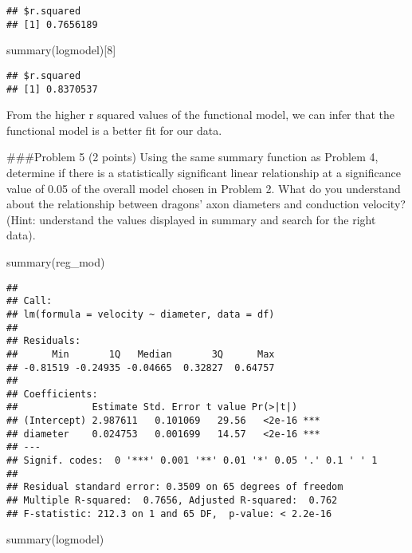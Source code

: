 \documentclass[
]{article}
\newenvironment{Shaded}{\begin{snugshade}}{\end{snugshade}}
\newcommand{\DecValTok}[1]{\textcolor[rgb]{0.00,0.00,0.81}{#1}}
\newcommand{\FunctionTok}[1]{\textcolor[rgb]{0.00,0.00,0.00}{#1}}
\newcommand{\NormalTok}[1]{#1}
\begin{document}
\begin{verbatim}
## $r.squared
## [1] 0.7656189
\end{verbatim}

\begin{Shaded}
\begin{Highlighting}[]
\FunctionTok{summary}\NormalTok{(logmodel)[}\DecValTok{8}\NormalTok{]}
\end{Highlighting}
\end{Shaded}

\begin{verbatim}
## $r.squared
## [1] 0.8370537
\end{verbatim}

From the higher r squared values of the functional model, we can infer
that the functional model is a better fit for our data.

\#\#\#Problem 5 (2 points) Using the same summary function as Problem 4,
determine if there is a statistically significant linear relationship at
a significance value of 0.05 of the overall model chosen in Problem 2.
What do you understand about the relationship between dragons' axon
diameters and conduction velocity? (Hint: understand the values
displayed in summary and search for the right data).

\begin{Shaded}
\begin{Highlighting}[]
\FunctionTok{summary}\NormalTok{(reg\_mod)}
\end{Highlighting}
\end{Shaded}

\begin{verbatim}
## 
## Call:
## lm(formula = velocity ~ diameter, data = df)
## 
## Residuals:
##      Min       1Q   Median       3Q      Max 
## -0.81519 -0.24935 -0.04665  0.32827  0.64757 
## 
## Coefficients:
##             Estimate Std. Error t value Pr(>|t|)    
## (Intercept) 2.987611   0.101069   29.56   <2e-16 ***
## diameter    0.024753   0.001699   14.57   <2e-16 ***
## ---
## Signif. codes:  0 '***' 0.001 '**' 0.01 '*' 0.05 '.' 0.1 ' ' 1
## 
## Residual standard error: 0.3509 on 65 degrees of freedom
## Multiple R-squared:  0.7656, Adjusted R-squared:  0.762 
## F-statistic: 212.3 on 1 and 65 DF,  p-value: < 2.2e-16
\end{verbatim}

\begin{Shaded}
\begin{Highlighting}[]
\FunctionTok{summary}\NormalTok{(logmodel)}
\end{Highlighting}
\end{Shaded}
\end{document}
